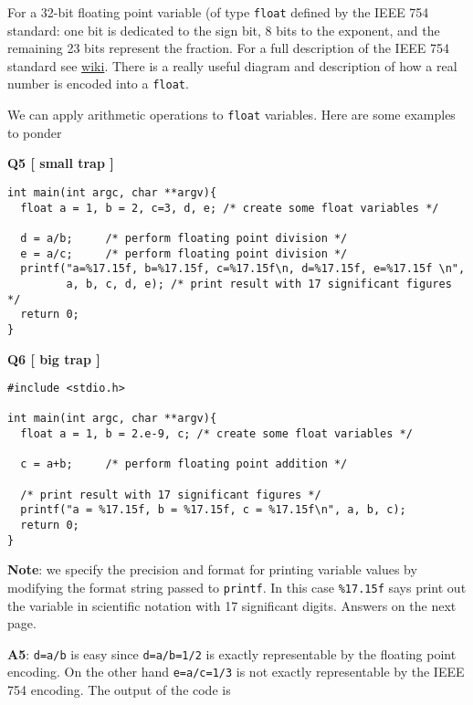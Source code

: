 For a 32-bit floating point variable (of type \texttt{float} defined by the IEEE 754 standard: one bit is dedicated to the sign bit, 8 bits to the exponent, and the remaining 23 bits represent the fraction. For a full description of the IEEE 754 standard see \href{ 
https://en.wikipedia.org/wiki/Single-precision_floating-point_format}{wiki}. There is a really useful diagram and description of how a real number is encoded into a \texttt{float}.


We can apply arithmetic operations to \texttt{float} variables.  Here are some examples to ponder

{\bf Q5 [ small trap ]}
\begin{verbatim}
int main(int argc, char **argv){
  float a = 1, b = 2, c=3, d, e; /* create some float variables */
  
  d = a/b;     /* perform floating point division */
  e = a/c;     /* perform floating point division */
  printf("a=%17.15f, b=%17.15f, c=%17.15f\n, d=%17.15f, e=%17.15f \n", 
         a, b, c, d, e); /* print result with 17 significant figures */
  return 0;
}
\end{verbatim}

{\bf Q6 [ big trap ]}
\begin{verbatim}
#include <stdio.h>

int main(int argc, char **argv){
  float a = 1, b = 2.e-9, c; /* create some float variables */

  c = a+b;     /* perform floating point addition */
  
  /* print result with 17 significant figures */
  printf("a = %17.15f, b = %17.15f, c = %17.15f\n", a, b, c);
  return 0;
}
\end{verbatim}

{\bf Note}: we specify the precision and format for printing variable values by modifying the format string passed to \texttt{printf}. In this case \texttt{\%17.15f} says print out the variable in scientific notation with 17 significant digits. Answers on the next page.

\newpage
{\bf A5}: \texttt{d=a/b} is easy since \texttt{d=a/b=1/2} is exactly representable by the floating point encoding. On the other hand \texttt{e=a/c=1/3} is not exactly representable by the IEEE 754 encoding. The output of the code is


